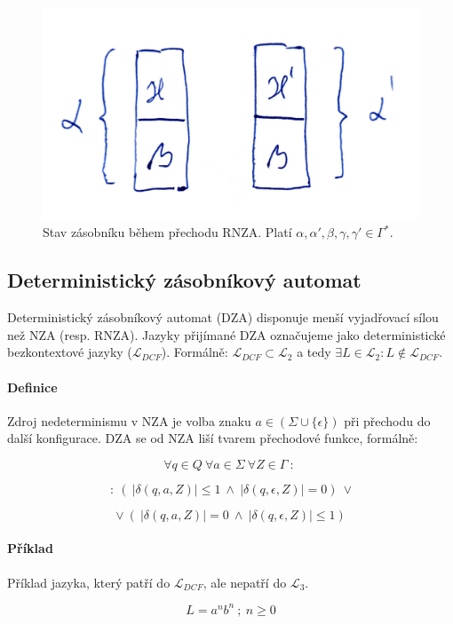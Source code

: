 \begin{figure}[H]
    \centering
    \includegraphics[width=0.35\linewidth]{rza_prechod_zasobnik.pdf}
    \caption{Stav zásobníku během přechodu RNZA. Platí $\alpha, \alpha', \beta, \gamma, \gamma' \in \Gamma^*$.}
\end{figure}

\subsection{Deterministický zásobníkový automat}

Deterministický zásobníkový automat (DZA) disponuje menší vyjadřovací sílou než NZA (resp. RNZA). Jazyky přijímané DZA označujeme jako deterministické bezkontextové jazyky ($\mathcal{L}_{DCF}$). Formálně: $\mathcal{L}_{DCF} \subset \mathcal{L}_2$ a tedy $\exists L \in \mathcal{L}_2 : L \not\in \mathcal{L}_{DCF}$.

\paragraph*{Definice} Zdroj nedeterminismu v NZA je volba znaku $a \in ( \Sigma \cup \{ \epsilon \} )$ při přechodu do další konfigurace. DZA se od NZA liší tvarem přechodové funkce, formálně:

$$ \forall q \in Q ~ \forall a \in \Sigma ~ \forall Z \in \Gamma ~:~ $$

$$ ~:~ ( ~ |\delta(q, a, Z)| \leq 1 ~\land~ | \delta(q, \epsilon, Z)| = 0 ) ~ \lor $$

$$ \lor ~ ( ~ |\delta(q, a, Z)| = 0 ~\land~ | \delta(q, \epsilon, Z)| \leq 1 ) $$

\paragraph*{Příklad} Příklad jazyka, který patří do $\mathcal{L}_{DCF}$, ale nepatří do $\mathcal{L}_{3}$.

$$L = a^n b^n ~;~ n \geq 0$$

